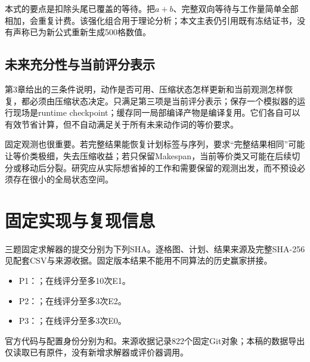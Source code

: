 \documentclass[anonymous,notoc]{gmcm2026}
\begin{document}
本式的要点是扣除头尾已覆盖的等待。把\(a+b\)、完整双向等待与工作量简单全部相加，会重复计费。该强化组合用于理论分析；本文主表仍引用既有冻结证书，没有声称已为新公式重新生成500格数值。

\subsection{未来充分性与当前评分表示}\label{ux672aux6765ux5145ux5206ux6027ux4e0eux5f53ux524dux8bc4ux5206ux8868ux793a}

第3章给出的三条件说明，动作是否可用、压缩状态怎样更新和当前观测怎样恢复，都必须由压缩状态决定。只满足第三项是当前评分表示；保存一个模拟器的运行现场是runtime checkpoint；缓存同一局部编译产物是编译复用。它们各自可以有效节省计算，但不自动满足关于所有未来动作词的等价要求。

固定观测也很重要。若完整结果能恢复计划标签与序列，要求``完整结果相同''可能让等价类极细，失去压缩收益；若只保留Makespan，当前等价类又可能在后续切分或移动后分裂。研究应从实际想省掉的工作和需要保留的观测出发，而不预设必须存在很小的全局状态空间。

\clearpage
\section{固定实现与复现信息}
三题固定求解器的提交分别为下列SHA。逐格图、计划、结果来源及完整SHA-256见配套CSV与来源收据。固定版本结果不能用不同算法的历史赢家拼接。
\begin{itemize}
\item P1：\texttt{}；在线评分至多10次E1。
\item P2：\texttt{}；在线评分至多3次E2。
\item P3：\texttt{}；在线评分至多3次E0。
\end{itemize}
官方代码与配置身份分别为\texttt{}和\texttt{}。来源收据记录822个固定Git对象；本稿的数据导出仅读取已有原件，没有新增求解器或评价器调用。
\end{document}
